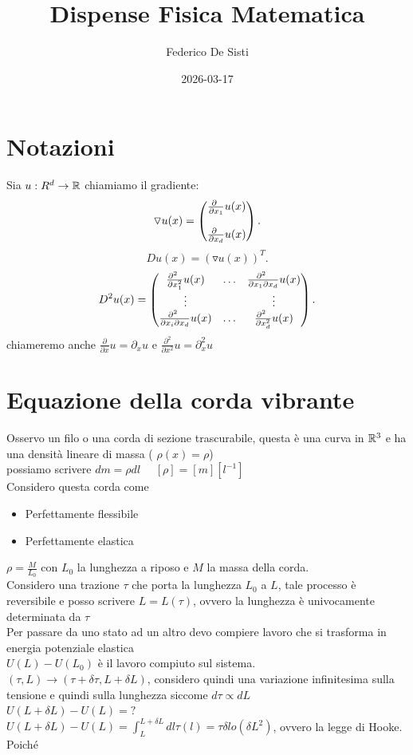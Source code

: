 \documentclass[12px]{article}
\title{Dispense Fisica Matematica}
\date{2026-03-17}
\author{Federico De Sisti}
\begin{document}
	\maketitle
	\newpage
	\section{Notazioni}
	Sia  $u: R^d \rightarrow \mathbb{R}$ chiamiamo il gradiente:
	 \[
		 \triangledown u(x) = \begin{pmatrix}\frac {\partial \ }{\partial x_1}u(x)\\ \\
	 \frac{\partial \ }{\partial x_d}u(x)\end{pmatrix}
	.\] 
	\[
	Du(x) = (\triangledown u(x))^T
	.\] 
	\[
		D^2u(x) = \matrice {\frac{ \partial^2 \ }{\partial x_1^2}u(x) & \ldots & \frac{ \partial^2 \ }{\partial x_1\partial x_d}u(x) \\
		\vdots & \ & \vdots\\
\frac{ \partial^2\ }{\partial x_i\partial x_d} u(x)& \ldots & \frac{ \partial^2 \ }{\partial x_d^2}u(x)}
	.\] 
	chiameremo anche $\frac{\partial } {\partial x} u = \partial_x u$ e $\frac{\partial^2}{\partial x^2} u = \partial_x^2 u$

	\section{Equazione della corda vibrante}
	Osservo un filo o una corda di sezione trascurabile, questa è una curva in $\mathbb{R}^3$ e ha una densità lineare di massa ( $\rho(x) = \rho$)\\
	possiamo scrivere  $d m = \rho dl$ \ \ $[\rho] = [m][l^{-1}]$\\
	Considero questa corda come
	 \begin{itemize}
		 \item Perfettamente flessibile
		 \item Perfettamente elastica
	\end{itemize}
	$\rho = \frac M {L_0}$ con $L_0$ la lunghezza a riposo e $M$ la massa della corda.\\
	Considero una trazione $\tau$ che porta la lunghezza  $L_0 $ a $L$, tale processo è reversibile e posso scrivere  $L = L(\tau)$, ovvero la lunghezza è univocamente determinata da  $\tau$\\
	Per passare da uno stato ad un altro devo compiere lavoro che si trasforma in energia potenziale elastica\\
	 $U(L) - U(L_0)$ è il lavoro compiuto sul sistema.\\
	 $(\tau,L) \rightarrow (\tau + \delta \tau , L + \delta L)$, considero quindi una variazione infinitesima sulla tensione e quindi sulla lunghezza siccome $d \tau \propto d L$\\
	  $U(L + \delta L) - U(L) = ?$\\
	  $U(L + \delta L) - U(L) = \int_L^{L+\delta L} dl \tau(l) = \tau\delta l o(\delta L^2)$, ovvero la legge di Hooke.
	  Poiché 

	
\end{document}
